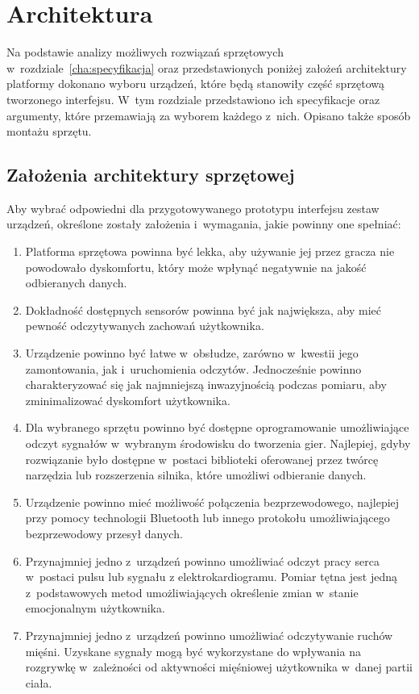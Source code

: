 \chapter{Architektura}
\label{cha:architektura}
Na podstawie analizy możliwych rozwiązań sprzętowych w~rozdziale~\ref{cha:specyfikacja} oraz przedstawionych poniżej założeń architektury platformy dokonano wyboru urządzeń, które będą stanowiły część sprzętową tworzonego interfejsu. W~tym rozdziale przedstawiono ich specyfikacje oraz argumenty, które przemawiają za wyborem każdego z~nich. Opisano także sposób montażu sprzętu.

\section{Założenia architektury sprzętowej}
Aby wybrać odpowiedni dla przygotowywanego prototypu interfejsu zestaw urządzeń, określone zostały założenia i~wymagania, jakie powinny one spełniać:
\begin{enumerate}
	\item Platforma sprzętowa powinna być lekka, aby używanie jej przez gracza nie powodowało dyskomfortu, który może wpłynąć negatywnie na jakość odbieranych danych.
	\item Dokładność dostępnych sensorów powinna być jak największa, aby mieć pewność odczytywanych zachowań użytkownika.
	\item Urządzenie powinno być łatwe w~obsłudze, zarówno w~kwestii jego zamontowania, jak i~uruchomienia odczytów. Jednocześnie powinno charakteryzować się jak najmniejszą inwazyjnością podczas pomiaru, aby zminimalizować dyskomfort użytkownika.
	\item Dla wybranego sprzętu powinno być dostępne oprogramowanie umożliwiające odczyt sygnałów w~wybranym środowisku do tworzenia gier. Najlepiej, gdyby rozwiązanie było dostępne w~postaci biblioteki oferowanej przez twórcę narzędzia lub rozszerzenia silnika, które umożliwi odbieranie danych.
	\item Urządzenie powinno mieć możliwość połączenia bezprzewodowego, najlepiej przy pomocy technologii Bluetooth lub innego protokołu umożliwiającego bezprzewodowy przesył danych.
	\item Przynajmniej jedno z~urządzeń powinno umożliwiać odczyt pracy serca w~postaci pulsu lub sygnału z elektrokardiogramu. Pomiar tętna jest jedną z~podstawowych metod umożliwiających określenie zmian w~stanie emocjonalnym użytkownika.
	\item Przynajmniej jedno z~urządzeń powinno umożliwiać odczytywanie ruchów mięśni. Uzyskane sygnały mogą być wykorzystane do wpływania na rozgrywkę w~zależności od aktywności mięśniowej użytkownika w~danej partii ciała.
\end{enumerate}


